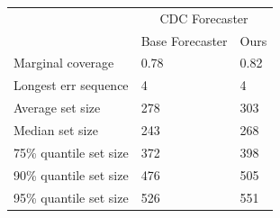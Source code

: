 \begin{tabular}{lll}
\toprule
& \multicolumn{2}{c}{CDC Forecaster} \\
& Base Forecaster & Ours \\
\midrule
Marginal coverage & 0.78 & 0.82 \\
Longest err sequence & 4 & 4 \\
Average set size & 278 & 303 \\
Median set size & 243 & 268 \\
75\% quantile set size & 372 & 398 \\
90\% quantile set size & 476 & 505 \\
95\% quantile set size & 526 & 551 \\
\bottomrule
\end{tabular}
